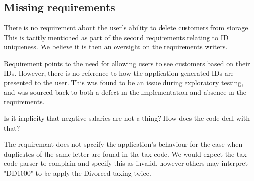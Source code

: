 

\subsection{Missing requirements}

There is no requirement about the user's ability to delete customers from storage. This is tacitly mentioned as part of the second requirements relating to ID uniqueness. We believe it is then an oversight on the requirements writers. 
\par
Requirement \RFour \space points to the need for allowing users to see customers based on their IDs. However, there is no reference to how the application-generated IDs are presented to the user. This was found to be an issue during exploratory testing, and was sourced back to both a defect in the implementation and absence in the requirements. 
\par
Is it implicity that negative salaries are not a thing? How does the code deal with that? 
\par
The requirement does not specify the application's behaviour for the case when duplicates of the same letter are found in the tax code. We would expect the tax code parser to complain and specify this as invalid, however others may interpret "DD1000" to be apply the Divorced taxing twice. 




